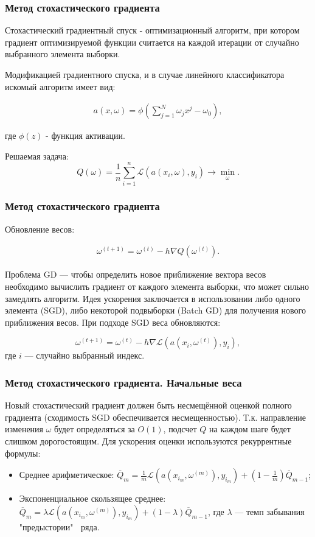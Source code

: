 \documentclass[11pt]{beamer}
\begin{document}
\begin{frame}
	\frametitle{Метод стохастического градиента}
	Стохастический градиентный спуск - оптимизационный алгоритм, при котором градиент оптимизируемой функции считается на каждой итерации от случайно выбранного элемента выборки. 
	
	Модификацией градиентного спуска, и в случае линейного классификатора искомый алгоритм имеет вид:
	
	\begin{eqnarray}
		a(x, \omega) = \phi(\sum\limits_{j=1}^N \omega_jx^j - \omega_0),
	\end{eqnarray}
	
	где $\phi(z) $ - функция активации. 
	
	Решаемая задача:
	$$ Q(\omega) = \frac{1}{n}\sum\limits_{i=1}^{n}\mathcal{L}(a(x_i, \omega), y_i)\rightarrow\min\limits_{\omega}. $$
\end{frame}

\begin{frame}
	\frametitle{Метод стохастического градиента}
	
	Обновление весов:
	
	\begin{eqnarray}
		\omega^{(t+1)} = \omega^{(t)} - h\nabla Q(\omega^{(t)}).
	\end{eqnarray}

	Проблема GD --- чтобы определить новое приближение вектора весов необходимо вычислить градиент от каждого элемента выборки, что может сильно замедлять алгоритм.
	Идея ускорения заключается в использовании либо одного элемента (SGD), либо некоторой подвыборки (Batch GD) для получения нового приближения весов. При подходе SGD веса обновляются:
	
	$$ \omega^{(t+1)} = \omega^{(t)} - h\nabla \mathcal{L}(a(x_i, \omega^{(t)}), y_i),$$ где $ i $ --- случайно выбранный индекс.

\end{frame}

\begin{frame}
	\frametitle{Метод стохастического градиента. Начальные веса}
	
	Новый стохастический градиент должен быть несмещённой оценкой полного градиента (сходимость SGD обеспечивается несмещенностью). Т.к. направление изменения $ \omega $ будет определяться за $ O(1) $, подсчет $ Q $ на каждом шаге будет слишком дорогостоящим. Для ускорения оценки используются рекуррентные формулы:
	\begin{itemize}
		\item Среднее арифметическое: $ \overline Q_m = \frac{1}{m}\mathcal{L}(a(x_{i_m}, \omega^{(m)}), y_{i_m}) + (1 - \frac{1}{m}) \overline Q_{m-1}$;
		\item Экспоненциальное скользящее среднее: $ \overline Q_m = \lambda\mathcal{L}(a(x_{i_m}, \omega^{(m)}), y_{i_m}) + (1 - \lambda) \overline Q_{m-1}$, где $ \lambda $ --- темп забывания "предыстории" $ \ $ ряда.
	\end{itemize}

\end{frame}
\end{document}
